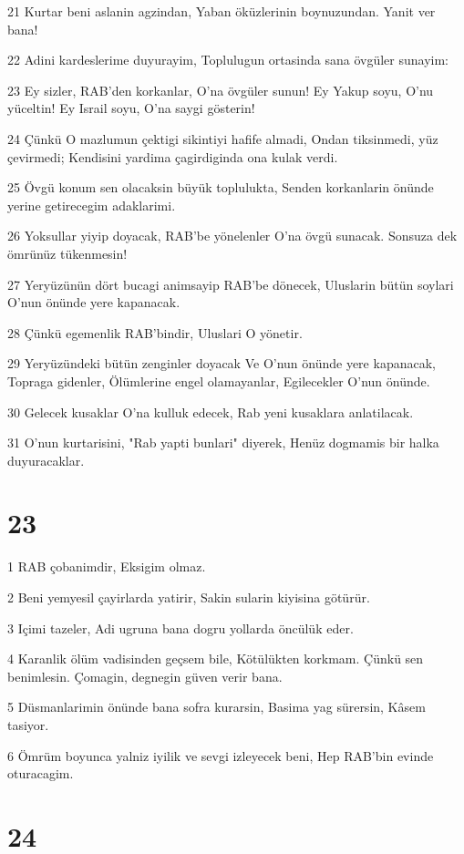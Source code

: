 \par 21 Kurtar beni aslanin agzindan, Yaban öküzlerinin boynuzundan. Yanit ver bana!
\par 22 Adini kardeslerime duyurayim, Toplulugun ortasinda sana övgüler sunayim:
\par 23 Ey sizler, RAB'den korkanlar, O'na övgüler sunun! Ey Yakup soyu, O'nu yüceltin! Ey Israil soyu, O'na saygi gösterin!
\par 24 Çünkü O mazlumun çektigi sikintiyi hafife almadi, Ondan tiksinmedi, yüz çevirmedi; Kendisini yardima çagirdiginda ona kulak verdi.
\par 25 Övgü konum sen olacaksin büyük toplulukta, Senden korkanlarin önünde yerine getirecegim adaklarimi.
\par 26 Yoksullar yiyip doyacak, RAB'be yönelenler O'na övgü sunacak. Sonsuza dek ömrünüz tükenmesin!
\par 27 Yeryüzünün dört bucagi animsayip RAB'be dönecek, Uluslarin bütün soylari O'nun önünde yere kapanacak.
\par 28 Çünkü egemenlik RAB'bindir, Uluslari O yönetir.
\par 29 Yeryüzündeki bütün zenginler doyacak Ve O'nun önünde yere kapanacak, Topraga gidenler, Ölümlerine engel olamayanlar, Egilecekler O'nun önünde.
\par 30 Gelecek kusaklar O'na kulluk edecek, Rab yeni kusaklara anlatilacak.
\par 31 O'nun kurtarisini, "Rab yapti bunlari" diyerek, Henüz dogmamis bir halka duyuracaklar.

\chapter{23}

\par 1 RAB çobanimdir, Eksigim olmaz.
\par 2 Beni yemyesil çayirlarda yatirir, Sakin sularin kiyisina götürür.
\par 3 Içimi tazeler, Adi ugruna bana dogru yollarda öncülük eder.
\par 4 Karanlik ölüm vadisinden geçsem bile, Kötülükten korkmam. Çünkü sen benimlesin. Çomagin, degnegin güven verir bana.
\par 5 Düsmanlarimin önünde bana sofra kurarsin, Basima yag sürersin, Kâsem tasiyor.
\par 6 Ömrüm boyunca yalniz iyilik ve sevgi izleyecek beni, Hep RAB'bin evinde oturacagim.

\chapter{24}

